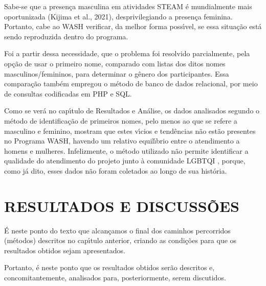 \documentclass[
12pt,		%
openright,	%
twoside,  %
a4paper,			%
chapter=TITLE,		%
english,			%
french,				%
spanish,			%
brazil				%
]{USPSC-classe/USPSC}
\begin{document}
Sabe-se que a presen\c{c}a masculina em atividades STEAM \'e mundialmente mais oportunizada  (Kijima et al., 2021),  desprivilegiando a presen\c{c}a feminina. Portanto, cabe ao WASH verificar, da melhor forma poss\'{\i}vel, se essa situa\c{c}\~ao est\'a sendo reproduzida dentro do programa.









Foi a partir dessa necessidade, que o problema foi resolvido parcialmente, pela op\c{c}\~ao de usar o primeiro nome, comparado com listas dos ditos nomes masculinos/femininos, para determinar o g\^enero dos participantes. Essa compara\c{c}\~ao tamb\'em empregou o m\'etodo de banco de dados relacional, por meio de consultas codificadas em PHP e SQL.









Como se ver\'a no cap\'{\i}tulo de Resultados e An\'alise, os dados analisados segundo o m\'etodo de identifica\c{c}\~ao de primeiros nomes, pelo menos ao que se refere a masculino e feminino, mostram que estes v\'{\i}cios e tend\^encias n\~ao est\~ao presentes no Programa WASH, havendo um relativo equil\'{\i}brio entre o atendimento a homens e mulheres. Infelizmente, o m\'etodo utilizado n\~ao permite identificar a qualidade do atendimento do projeto junto \`a comunidade LGBTQI , porque, como j\'a dito, esses dados n\~ao foram coletados ao longo de sua hist\'oria.









\chapter[RESULTADOS E DISCUSS\~OES]{RESULTADOS E DISCUSS\~OES}\label{RESULTADOS E DISCUSS\~OES}
\'E neste ponto do texto que alcan\c{c}amos o final dos caminhos percorridos (m\'etodos) descritos no cap\'{\i}tulo anterior, criando as condi\c{c}\~oes para que os resultados obtidos sejam apresentados.









Portanto, \'e neste ponto que os resultados obtidos ser\~ao descritos e, concomitantemente, analisados para, posteriormente, serem discutidos.
\end{document}
